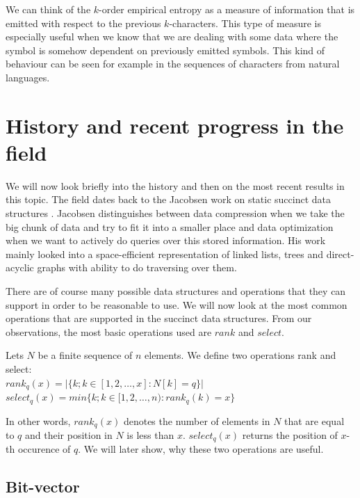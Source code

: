 We can think of the $k$-order empirical entropy as a measure of information that is emitted with respect to the previous $k$-characters. This type of measure is especially useful when we know that we are dealing with some data where the symbol is somehow dependent on previously emitted symbols. This kind of behaviour can be seen for example in the sequences of characters from natural languages.

\section{History and recent progress in the field}

We will now look briefly into the history and then on the most recent results in this topic. The field dates back to the Jacobsen work on static succinct data structures \cite{jacobson1988succinct}. Jacobsen distinguishes between data compression when we take the big chunk of data and try to fit it into a smaller place and
data optimization when we want to actively do queries over this stored information. His work mainly looked into a space-efficient representation of linked lists, trees and direct-acyclic graphs with ability to do traversing over them.

There are of course many possible data structures and operations that they can support in order to be reasonable to use. We will now look at the most common operations that are supported in the succinct data structures. From our observations, the most basic operations used are $rank$ and $select$.

\begin{theorem}
Lets $N$ be a finite sequence of $n$ elements.
We define two operations rank and select: \\
$rank_q(x) = | \{k; k \in [ 1, 2, \ldots, x] : N[k] = q  \} |$ \\
$select_q(x) = min \{k; k \in [ 1, 2, \ldots, n) : rank_q(k)=x  \} $
\end{theorem}

In other words, $rank_q(x)$ denotes the number of elements in $N$ that are equal to $q$ and their position in $N$ is less than $x$. $select_q(x)$ returns the position of $x$-th occurence of $q$. We will later show, why these two operations are useful.

\subsection{Bit-vector}


